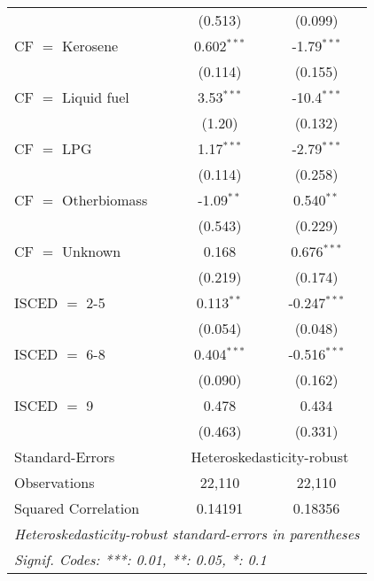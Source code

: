 \begin{table}[htbp!]
\begin{adjustbox}{width = 1\textwidth, max height = 0.95\textheight, center}
\begin{threeparttable}[b]
\begin{tabular}{lcc}
                                 & (0.513)        & (0.099)\\   
            CF $=$ Kerosene      & 0.602$^{***}$  & -1.79$^{***}$\\   
                                 & (0.114)        & (0.155)\\   
            CF $=$ Liquid fuel   & 3.53$^{***}$   & -10.4$^{***}$\\   
                                 & (1.20)         & (0.132)\\   
            CF $=$ LPG           & 1.17$^{***}$   & -2.79$^{***}$\\   
                                 & (0.114)        & (0.258)\\   
            CF $=$ Otherbiomass  & -1.09$^{**}$   & 0.540$^{**}$\\   
                                 & (0.543)        & (0.229)\\   
            CF $=$ Unknown       & 0.168          & 0.676$^{***}$\\   
                                 & (0.219)        & (0.174)\\   
            ISCED $=$ 2-5        & 0.113$^{**}$   & -0.247$^{***}$\\   
                                 & (0.054)        & (0.048)\\   
            ISCED $=$ 6-8        & 0.404$^{***}$  & -0.516$^{***}$\\   
                                 & (0.090)        & (0.162)\\   
            ISCED $=$ 9          & 0.478          & 0.434\\   
                                 & (0.463)        & (0.331)\\   
            \midrule 
            Standard-Errors & \multicolumn{2}{c}{Heteroskedasticity-robust} \\ 
            Observations         & 22,110         & 22,110\\  
            Squared Correlation  & 0.14191        & 0.18356\\  
            \midrule \midrule
            \multicolumn{3}{l}{\emph{Heteroskedasticity-robust standard-errors in parentheses}}\\
            \multicolumn{3}{l}{\emph{Signif. Codes: ***: 0.01, **: 0.05, *: 0.1}}\\
         \end{tabular}
         

\end{threeparttable}
\end{adjustbox}
\end{table}
